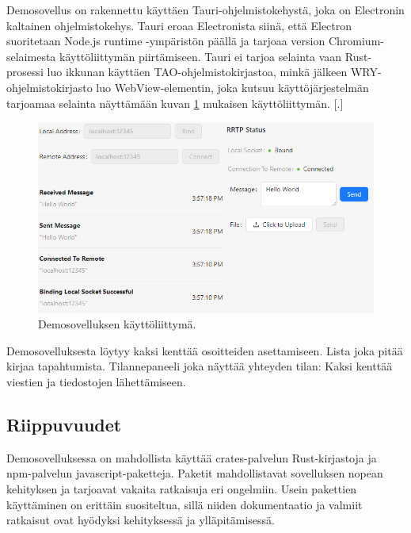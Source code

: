 \documentclass[a4paper,12pt]{article}
\begin{document}
    Demosovellus on rakennettu käyttäen Tauri-ohjelmistokehystä, joka on Electronin kaltainen ohjelmistokehys. Tauri eroaa Electronista siinä, että Electron suoritetaan Node.js runtime -ympäristön päällä ja tarjoaa version Chromium-selaimesta käyttöliittymän piirtämiseen. Tauri ei tarjoa selainta vaan Rust-prosessi luo ikkunan käyttäen TAO-ohjelmistokirjastoa, minkä jälkeen WRY-ohjelmistokirjasto luo WebView-elementin, joka kutsuu käyttöjärjestelmän tarjoamaa selainta näyttämään kuvan \ref{fig:demo_interface} mukaisen käyttöliittymän. [.]

    \begin{figure}[h!]
        \centering
        
        \includegraphics[width=\textwidth]{doc/latex/src/images/RRTP.png}
        \caption{Demosovelluksen käyttöliittymä.}
        \label{fig:demo_interface}
    \end{figure}
    
    Demosovelluksesta löytyy kaksi kenttää osoitteiden asettamiseen. Lista joka
    pitää kirjaa tapahtumista. Tilannepaneeli joka näyttää yhteyden tilan:
    Kaksi kenttää viestien ja tiedostojen lähettämiseen. \par

    \subsection{Riippuvuudet}
    Demosovelluksessa on mahdollista käyttää crates-palvelun Rust-kirjastoja ja npm-palvelun javascript-paketteja. Paketit mahdollistavat sovelluksen nopean kehityksen ja tarjoavat vakaita ratkaisuja eri ongelmiin. Usein pakettien käyttäminen on erittäin suositeltua, sillä niiden dokumentaatio ja valmiit ratkaisut ovat hyödyksi kehityksessä ja ylläpitämisessä.
\end{document}
